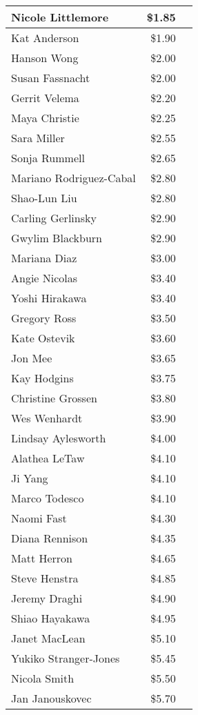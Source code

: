\begin{longtable}{|l|r|c|}
Nicole Littlemore & \$1.85 & \\\hline
Kat Anderson & \$1.90 & \\\hline
Hanson Wong & \$2.00 & \\\hline
Susan Fassnacht & \$2.00 & \\\hline
Gerrit Velema & \$2.20 & \\\hline
Maya Christie & \$2.25 & \\\hline
Sara Miller & \$2.55 & \\\hline
Sonja Rummell & \$2.65 & \\\hline
Mariano Rodriguez-Cabal & \$2.80 & \\\hline
Shao-Lun Liu & \$2.80 & \\\hline
Carling Gerlinsky & \$2.90 & \\\hline
Gwylim Blackburn & \$2.90 & \\\hline
Mariana Diaz & \$3.00 & \\\hline
Angie Nicolas & \$3.40 & \\\hline
Yoshi Hirakawa & \$3.40 & \\\hline
Gregory Ross & \$3.50 & \\\hline
Kate Ostevik & \$3.60 & \\\hline
Jon Mee & \$3.65 & \\\hline
Kay Hodgins & \$3.75 & \\\hline
Christine Grossen & \$3.80 & \\\hline
Wes Wenhardt & \$3.90 & \\\hline
Lindsay Aylesworth & \$4.00 & \\\hline
Alathea LeTaw & \$4.10 & \\\hline
Ji Yang & \$4.10 & \\\hline
Marco Todesco & \$4.10 & \\\hline
Naomi Fast & \$4.30 & \\\hline
Diana Rennison & \$4.35 & \\\hline
Matt Herron & \$4.65 & \\\hline
Steve Henstra & \$4.85 & \\\hline
Jeremy Draghi & \$4.90 & \\\hline
Shiao Hayakawa & \$4.95 & \\\hline
Janet MacLean & \$5.10 & \\\hline
Yukiko Stranger-Jones & \$5.45 & \\\hline
Nicola Smith & \$5.50 & \\\hline
Jan Janouskovec & \$5.70 & \\\hline

\end{longtable}

